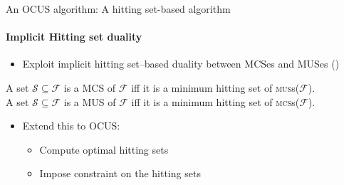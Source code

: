 \documentclass{beamer}
\newcommand\m[1]{\ensuremath{\mathcal{#1}}\xspace}
\newcommand\formula{\ensuremath{\m{F} }\xspace}
\renewcommand\emph[1]{{\color{vuborange}#1}}
\newcommand\subsetT{\m{\mathcal{S}}}
\newcommand\muses[1]{\textsc{mus}s(\m{#1})}
\newcommand\mcses[1]{\textsc{mcs}s(\m{#1})}
\begin{document}
%
%				
%				
%				



			
					\begin{frame}{An OCUS algorithm: A hitting set-based algorithm}
				\framesubtitle{Implicit Hitting set duality}
				
				\begin{itemize}
					\item[$\triangleright$] Exploit implicit hitting set--based duality between {\color{blue}MCSes} and {\color{teal}MUSes} (\cite{DBLP:journals/jar/LiffitonS08,ai/Reiter87})
				\end{itemize}\pause
				
				\begin{theorem}\label{prop:MCS-MUS-hittingset}
					A set  $\subsetT \subseteq \formula$ is a MCS of $ \formula$ iff  it is a \emph{minimum hitting set} of \muses{\formula}. \\
					A set  $\subsetT \subseteq \formula$ is a MUS of $ \formula$ iff  it is a \emph{minimum hitting set} of \mcses{\formula}.
				\end{theorem} \pause
				\begin{itemize}
					\item[$\triangleright$] Extend this to OCUS:
				\begin{itemize}	
				\item Compute \emph{optimal} hitting sets \pause
				\item Impose \emph{constraint} on the hitting sets
			\end{itemize}
				\end{itemize}
				
			\end{frame}
			
\end{document}
